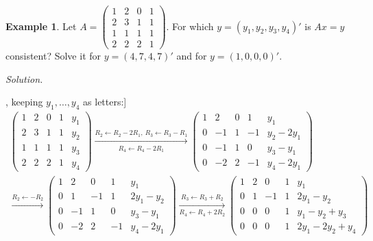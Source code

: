 \documentclass[12pt]{article}
\theoremstyle{definition}
\newtheorem{example}[theorem]{Example}
\begin{document}
\begin{example}\label{b2.10}
Let \(A=\left(\begin{smallmatrix}1&2&0&1\\2&3&1&1\\1&1&1&1\\2&2&2&1\end{smallmatrix}\right)\). For which
\(y=(y_1,y_2,y_3,y_4)'\) is \(Ax=y\) consistent? Solve it for \(y=(4,7,4,7)'\) and for \(y=(1,0,0,0)'\).
\end{example}
\textit{Solution.}
\begin{board}[Forward elimination of \([A\mid y]\), keeping \(y_1,\dots,y_4\) as letters:]
\[
\begin{gathered}
\left(\begin{array}{cccc|c}1&2&0&1&y_1\\2&3&1&1&y_2\\1&1&1&1&y_3\\2&2&2&1&y_4\end{array}\right)
\xrightarrow[R_4\leftarrow R_4-2R_1]{R_2\leftarrow R_2-2R_1,\ R_3\leftarrow R_3-R_1}
\left(\begin{array}{cccc|c}1&2&0&1&y_1\\0&-1&1&-1&y_2-2y_1\\0&-1&1&0&y_3-y_1\\0&-2&2&-1&y_4-2y_1\end{array}\right)
\\
\xrightarrow{R_2\leftarrow-R_2}
\left(\begin{array}{cccc|c}1&2&0&1&y_1\\0&1&-1&1&2y_1-y_2\\0&-1&1&0&y_3-y_1\\0&-2&2&-1&y_4-2y_1\end{array}\right)
\xrightarrow[R_4\leftarrow R_4+2R_2]{R_3\leftarrow R_3+R_2}
\left(\begin{array}{cccc|c}1&2&0&1&y_1\\0&1&-1&1&2y_1-y_2\\0&0&0&1&y_1-y_2+y_3\\0&0&0&1&2y_1-2y_2+y_4\end{array}\right)
\end{gathered}
\]
\end{board}
\end{document}
